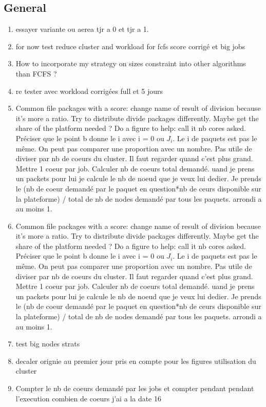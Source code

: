 \documentclass[a4paper]{article}
\begin{document}
	\subsection{General}
		\begin{enumerate}
			\item essayer variante ou aerea tjr a 0 et tjr a 1.
			\item for now test reduce cluster and workload for fcfs score corrigé et big jobs
			\item How to incorporate my strategy on sizes constraint into other algorithms than FCFS ?
			\item re tester avec workload corrigées full et 5 jours
			\item Common file packages with a score: change name of result of division because it's more a ratio. Try to distribute divide packages differently. Maybe get the share of the platform needed ? Do a figure to help: call it nb cores asked. Préciser que le point b donne le i avec i = 0 ou $J_i$. Le i de paquets est pas le même. On peut pas comparer une proportion avec un nombre. Pas utile de diviser par nb de coeurs du cluster. Il faut regarder quand c'est plus grand. Mettre 1 coeur par job. Calculer nb de coeurs total demandé. uand je prens un packets pour lui je calcule le nb de noeud que je veux lui dedier. Je prends le (nb de coeur demandé par le paquet en question*nb de ceurs disponible sur la plateforme) / total de nb de nodes demandé par tous les paquets. arrondi a au moins 1.
			\item Common file packages with a score: change name of result of division because it's more a ratio. Try to distribute divide packages differently. Maybe get the share of the platform needed ? Do a figure to help: call it nb cores asked. Préciser que le point b donne le i avec i = 0 ou $J_i$. Le i de paquets est pas le même. On peut pas comparer une proportion avec un nombre. Pas utile de diviser par nb de coeurs du cluster. Il faut regarder quand c'est plus grand. Mettre 1 coeur par job. Calculer nb de coeurs total demandé. uand je prens un packets pour lui je calcule le nb de noeud que je veux lui dedier. Je prends le (nb de coeur demandé par le paquet en question*nb de ceurs disponible sur la plateforme) / total de nb de nodes demandé par tous les paquets. arrondi a au moins 1.
			\item test big nodes strats
			\item decaler orignie au premier jour pris en compte pour les figures utilisation du cluster
			\item Compter le nb de coeurs demandé par les jobs et compter pendant pendant l'execution combien de coeurs j'ai a la date 16

\end{enumerate}
\end{document}
